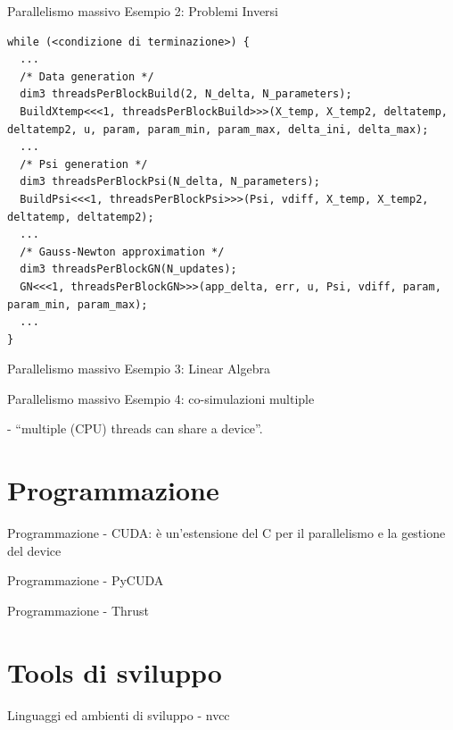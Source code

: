 \documentclass{beamer}
\begin{document}
\begin{frame}[fragile]{Parallelismo massivo}
Esempio 2: Problemi Inversi

\begin{lstlisting}
while (<condizione di terminazione>) {
  ...
  /* Data generation */
  dim3 threadsPerBlockBuild(2, N_delta, N_parameters);
  BuildXtemp<<<1, threadsPerBlockBuild>>>(X_temp, X_temp2, deltatemp, deltatemp2, u, param, param_min, param_max, delta_ini, delta_max);
  ...
  /* Psi generation */
  dim3 threadsPerBlockPsi(N_delta, N_parameters);
  BuildPsi<<<1, threadsPerBlockPsi>>>(Psi, vdiff, X_temp, X_temp2, deltatemp, deltatemp2);
  ...
  /* Gauss-Newton approximation */
  dim3 threadsPerBlockGN(N_updates);
  GN<<<1, threadsPerBlockGN>>>(app_delta, err, u, Psi, vdiff, param, param_min, param_max);
  ...
}
\end{lstlisting}

\end{frame}


\begin{frame}{Parallelismo massivo}
Esempio 3: Linear Algebra
\end{frame}


\begin{frame}{Parallelismo massivo}
Esempio 4: co-simulazioni multiple

- ``multiple (CPU) threads can share a device''.

\end{frame}



\section{Programmazione}
\begin{frame}{Programmazione}
- CUDA: è un'estensione del C per il parallelismo e la gestione del device

\end{frame}


\begin{frame}{Programmazione}
- PyCUDA

\end{frame}


\begin{frame}{Programmazione}
- Thrust

\end{frame}



\section{Tools di sviluppo}
\begin{frame}{Linguaggi ed ambienti di sviluppo}
- nvcc

\end{frame}
\end{document}
